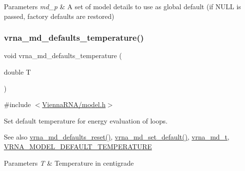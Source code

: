 \begin{DoxyParams}{Parameters}
{\em md\+\_\+p} & A set of model details to use as global default (if N\+U\+LL is passed, factory defaults are restored) \\
\hline
\end{DoxyParams}
\mbox{\label{group__model__details_gaf9e527e9a2f7e6fd6e42bc6e602f5445}} 
\subsubsection{\texorpdfstring{vrna\+\_\+md\+\_\+defaults\+\_\+temperature()}{vrna\_md\_defaults\_temperature()}}
{\footnotesize\ttfamily void vrna\+\_\+md\+\_\+defaults\+\_\+temperature (\begin{DoxyParamCaption}\item[{double}]{T }\end{DoxyParamCaption})}



{\ttfamily \#include $<$\hyperlink{model_8h}{Vienna\+R\+N\+A/model.\+h}$>$}



Set default temperature for energy evaluation of loops. 

\begin{DoxySeeAlso}{See also}
\hyperlink{group__model__details_ga70834424cf804d149937de89f80ceb45}{vrna\+\_\+md\+\_\+defaults\+\_\+reset()}, \hyperlink{group__model__details_ga8ac6ff84936282436f822644bf841f66}{vrna\+\_\+md\+\_\+set\+\_\+default()}, \hyperlink{group__model__details_ga1f8a10e12a0a1915f2a4eff0b28ea17c}{vrna\+\_\+md\+\_\+t}, \hyperlink{group__model__details_gaf47f9850b3b4763479f7a7e7a15648a2}{V\+R\+N\+A\+\_\+\+M\+O\+D\+E\+L\+\_\+\+D\+E\+F\+A\+U\+L\+T\+\_\+\+T\+E\+M\+P\+E\+R\+A\+T\+U\+RE} 
\end{DoxySeeAlso}

\begin{DoxyParams}{Parameters}
{\em T} & Temperature in centigrade \\
\hline
\end{DoxyParams}
\mbox{\label{group__model__details_ga96b24a74437f9ba46c4e06343155bf46}} 
